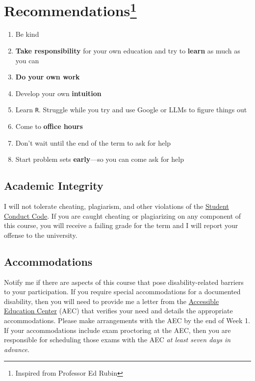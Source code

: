 \documentclass[
  letterpaper,
  DIV=11,
  numbers=noendperiod]{scrartcl}
\begin{document}
\section[Recommendations]{\texorpdfstring{Recommendations\footnote{Inspired
  from Professor Ed Rubin}}{Recommendations}}\label{recommendations}

\begin{enumerate}
\def\labelenumi{\arabic{enumi}.}
\item
  Be kind
\item
  \textbf{Take responsibility} for your own education and try to
  \textbf{learn} as much as you can
\item
  \textbf{Do your own work}
\item
  Develop your own \textbf{intuition}
\item
  Learn \texttt{R}. Struggle while you try and use Google or LLMs to
  figure things out
\item
  Come to \textbf{office hours}
\item
  Don't wait until the end of the term to ask for help
\item
  Start problem sets \textbf{early}---so you can come ask for help
\end{enumerate}

\subsection{Academic Integrity}\label{academic-integrity}

I will not tolerate cheating, plagiarism, and other violations of the
\href{https://studentlife.uoregon.edu/conduct}{Student Conduct Code}. If
you are caught cheating or plagiarizing on any component of this course,
you will receive a failing grade for the term and I will report your
offense to the university.

\subsection{Accommodations}\label{accommodations}

Notify me if there are aspects of this course that pose
disability-related barriers to your participation. If you require
special accommodations for a documented disability, then you will need
to provide me a letter from the
\href{https://aec.uoregon.edu/}{Accessible Education Center} (AEC) that
verifies your need and details the appropriate accommodations. Please
make arrangements with the AEC by the end of Week 1. If your
accommodations include exam proctoring at the AEC, then you are
responsible for scheduling those exams with the AEC \emph{at least seven
days in advance}.
\end{document}
